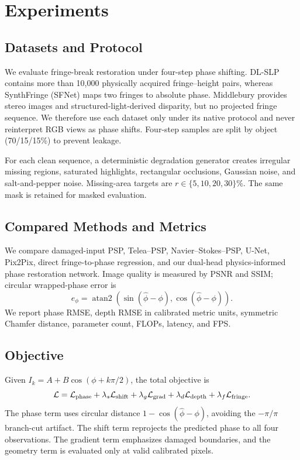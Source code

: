 \section{Experiments}
\subsection{Datasets and Protocol}
We evaluate fringe-break restoration under four-step phase shifting.
DL-SLP contains more than 10,000 physically acquired fringe--height pairs,
whereas SynthFringe (SFNet) maps two fringes to absolute phase. Middlebury
provides stereo images and structured-light-derived disparity, but no projected
fringe sequence. We therefore use each dataset only under its native protocol
and never reinterpret RGB views as phase shifts. Four-step samples are split by
object (70/15/15\%) to prevent leakage.

For each clean sequence, a deterministic degradation generator creates
irregular missing regions, saturated highlights, rectangular occlusions,
Gaussian noise, and salt-and-pepper noise. Missing-area targets are
$r\in\{5,10,20,30\}\%$. The same mask is retained for masked evaluation.

\subsection{Compared Methods and Metrics}
We compare damaged-input PSP, Telea--PSP, Navier--Stokes--PSP, U-Net,
Pix2Pix, direct fringe-to-phase regression, and our dual-head
physics-informed phase restoration network. Image quality is measured by PSNR
and SSIM; circular wrapped-phase error is
\begin{equation}
e_\phi=\operatorname{atan2}(\sin(\hat\phi-\phi),\cos(\hat\phi-\phi)).
\end{equation}
We report phase RMSE, depth RMSE in calibrated metric units, symmetric Chamfer
distance, parameter count, FLOPs, latency, and FPS.

\subsection{Objective}
Given $I_k=A+B\cos(\phi+k\pi/2)$, the total objective is
\begin{equation}
\mathcal L=\mathcal L_{\rm phase}+
\lambda_s\mathcal L_{\rm shift}+
\lambda_g\mathcal L_{\rm grad}+
\lambda_d\mathcal L_{\rm depth}+
\lambda_f\mathcal L_{\rm fringe}.
\end{equation}
The phase term uses circular distance $1-\cos(\hat\phi-\phi)$, avoiding the
$-\pi/\pi$ branch-cut artifact. The shift term reprojects the predicted phase
to all four observations. The gradient term emphasizes damaged boundaries,
and the geometry term is evaluated only at valid calibrated pixels.

